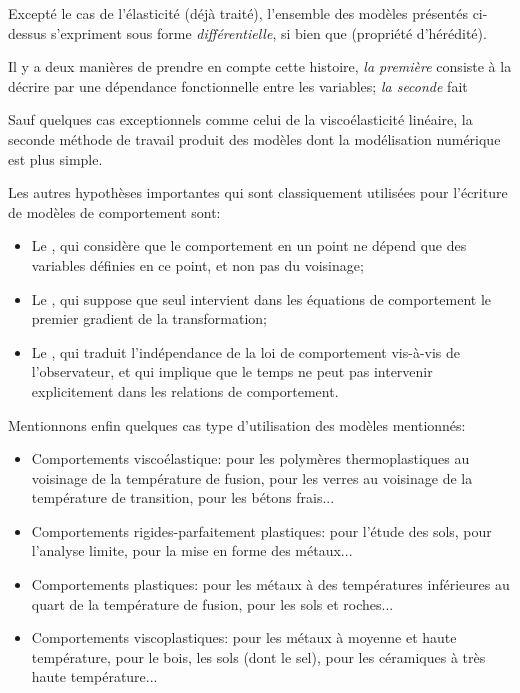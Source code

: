\medskip
Excepté le cas de l'élasticité (déjà traité), l'ensemble des modèles présentés ci-dessus s'expriment 
sous forme \emph{différentielle}, si bien que  (propriété d'hérédité). 

Il y a deux manières de prendre en compte cette histoire, \emph{la première} consiste à la décrire par une 
dépendance fonctionnelle entre les variables; \emph{la seconde} fait  

Sauf quelques cas exceptionnels comme celui de la viscoélasticité linéaire, la seconde méthode de 
travail produit des modèles dont la modélisation numérique est plus simple. 

\medskip
Les autres hypothèses importantes qui sont classiquement utilisées pour l'écriture de modèles de 
comportement sont:
\begin{itemize}
   \item Le , qui considère que le comportement en un point ne dépend 
	que des variables définies en ce point, et non pas du voisinage;
   \item Le , qui suppose que seul intervient dans les équations 
	de comportement le premier gradient de la transformation;
   \item Le , qui traduit l'indépendance de la loi de comportement vis-à-vis 
	de l'observateur, et qui implique que le temps ne peut pas intervenir explicitement dans les relations de 
	comportement.
\end{itemize}

\medskip
Mentionnons enfin quelques cas type d'utilisation des modèles mentionnés:
\begin{itemize}
   \item Comportements viscoélastique: pour les polymères thermoplastiques au voisinage de la température 
	de fusion, pour les verres au voisinage de la température de transition, pour les bétons frais...
   \item Comportements rigides-parfaitement plastiques: pour l'étude des sols, pour l'analyse limite, 
	pour la mise en forme des métaux...
   \item Comportements plastiques: pour les métaux à des températures inférieures au quart de la 
	température de fusion, pour les sols et roches...
   \item Comportements viscoplastiques: pour les métaux à moyenne et haute température,
	pour le bois, les sols (dont le sel), pour les céramiques à très haute température...
\end{itemize}

